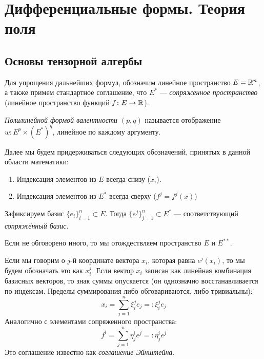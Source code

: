 \section{Дифференциальные формы. Теория поля}

\subsection{Основы тензорной алгербы}

\begin{note}
	Для упрощения дальнейших формул, обозначим линейное пространство $E = \mathbb{R}^n$, а также примем стандартное соглашение, что $E^*$ --- \textit{сопряженное пространство} (линейное пространство функций $f \colon E \to \mathbb{R}$).
\end{note}

\begin{definition}
	\textit{Полилинейной формой валентности} $(p, q)$ называется отображение $w \colon E^p \times (E^*)^q$, линейное по каждому аргументу.
\end{definition}

\begin{note}
	Далее мы будем придерживаться следующих обозначений, принятых в данной области математики:
	\begin{enumerate}
		\item Индексация элементов из $E$ всегда снизу ($x_i$).
		
		\item Индексация элементов из $E^*$ всегда сверху ($f^j = f^j(x)$)
	\end{enumerate}
\end{note}

\begin{note}
	Зафиксируем базис $\{e_i\}_{i = 1}^n \subset E$. Тогда $\{e^j\}_{j = 1}^n \subset E^*$ --- соответствующий \textit{сопряжённый базис}.
\end{note}

\begin{note}
	Если не обговорено иного, то мы отождествляем пространство $E$ и $E^{**}$.
\end{note}

\begin{note}
	Если мы говорим о $j$-й координате вектора $x_i$, которая равна $e^j(x_i)$, то мы будем обозначать это как $x_i^j$. Если вектор $x_i$ записан как линейная комбинация базисных векторов, то знак суммы опускается (он однозначно восстанавливается по индексам. Пределы суммирования либо обговариваются, либо тривиальны):
	\[
		x_i = \sum_{j = 1}^n \xi_i^j e_j =: \xi_i^j e_j
	\]
	Аналогично с элементами сопряженного пространства:
	\[
		f^i = \sum_{j = 1}^n \eta_j^i e^j =: \eta_j^i e^j
	\]
	Это соглашение известно как \textit{соглашение Эйнштейна}.
\end{note}


